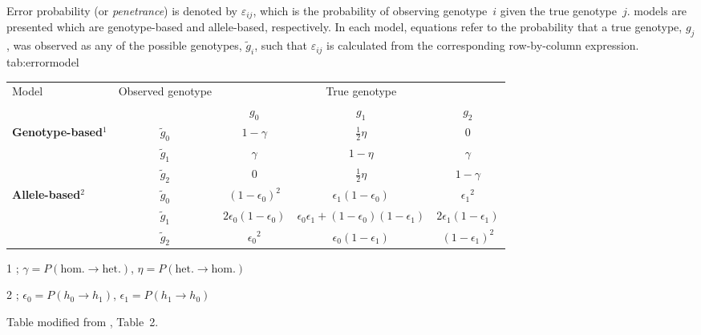 

\begin{table}[!htb]
{Error probability (or \emph{penetrance}) is denoted by $\varepsilon_{ij}$, which is the probability of observing genotype~$i$ given the true genotype~$j$.
 models are presented which are genotype-based and allele-based, respectively.
In each model, equations refer to the probability that a true genotype, $g_j$, was observed as any of the possible genotypes, $\tilde{g}_i$, such that $\varepsilon_{ij}$ is calculated from the corresponding row-by-column expression.
}
{tab:errormodel}
\centering
\begin{threeparttable}
\renewcommand{\arraystretch}{1.1}%
\begin{tabular}{lcccc}
\toprule
Model & Observed genotype & \multicolumn{3}{c}{True genotype} \\ \cmidrule(lr){3-5}
  &  & $g_0$ & $g_1$ & $g_2$ \\ \midrule
\textbf{Genotype-based$^1$}
& $\tilde{g}_0$ &  $1 - \gamma$ &  $\tfrac{1}{2}\eta$ &  $0$          \\[1.2ex]
& $\tilde{g}_1$ &  $\gamma$     &  $1 - \eta$         &  $\gamma$     \\[1.2ex]
& $\tilde{g}_2$ &  $0$          &  $\tfrac{1}{2}\eta$ &  $1 - \gamma$ \\ \midrule
\textbf{Allele-based$^2$}
& $\tilde{g}_0$
	&  ${(1 - \epsilon_0)^2}$
	&  ${\epsilon_1 (1 - \epsilon_0)}$
	&  ${\epsilon_1}^2$  \\[1.2ex]
&  $\tilde{g}_1$
	&  ${2 \epsilon_0 (1 - \epsilon_0)}$
	&  ${\epsilon_0 \epsilon_1 + (1 - \epsilon_0)(1 - \epsilon_1)}$
	&  ${2 \epsilon_1 (1 - \epsilon_1)}$  \\[1.2ex]
&  $\tilde{g}_2$
	&  ${\epsilon_0}^2$
	&  ${\epsilon_0 (1 - \epsilon_1)}$
	&  ${(1 - \epsilon_1)^2}$  \\ \bottomrule
\end{tabular}
\begin{tablenotes}\footnotesize
	\item[1] \citet{Douglas:2002hp};
	\quad $\gamma = P(\text{hom.} \rightarrow \text{het.})$,
	\quad $\eta = P(\text{het.} \rightarrow \text{hom.})$
	\item[2] \citet{Gordon:2001im};
	\quad $\epsilon_0 = P(h_0 \rightarrow h_1)$,
	\quad $\epsilon_1 = P(h_1 \rightarrow h_0)$
\end{tablenotes}
\begin{tablenotes}[para]\footnotesize
Table modified from \citet{Gordon:2002cz}, Table~2.
\end{tablenotes}
\end{threeparttable}
\end{table}
